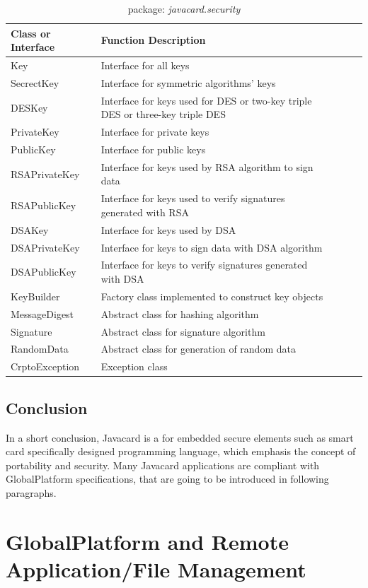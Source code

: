 \begin{table}[ht]
\caption{package: \emph{javacard.security}}
\centering
\begin{tabular}{lllll}
\hline
 Class or Interface & Function Description\\
\hline\hline
 Key &Interface for all keys   \\
 SecrectKey &Interface for symmetric algorithms' keys\\
DESKey & \parbox[t]{10cm}{Interface for keys used for DES or two-key triple DES or three-key triple DES}\\
PrivateKey &Interface for private keys\\
PublicKey & Interface for public keys\\
RSAPrivateKey& Interface for keys used by RSA algorithm to sign data\\
RSAPublicKey & Interface for keys used to verify signatures generated with RSA \\
DSAKey& Interface for keys used by DSA\\ 
DSAPrivateKey& Interface for keys to sign data with DSA algorithm\\
DSAPublicKey& Interface for keys to verify signatures generated with DSA\\
KeyBuilder& Factory class implemented to construct key objects\\
MessageDigest& Abstract class for hashing algorithm\\
Signature& Abstract class for signature algorithm\\
RandomData&Abstract class for generation of random data \\
CrptoException& Exception class\\
\hline
\end{tabular}
\label{table:javacard-security}
\end{table}

\subsection{Conclusion}
In a short conclusion, Javacard is a for embedded secure elements such as smart card specifically designed programming language, which emphasis the concept of portability and security. Many Javacard applications are compliant with GlobalPlatform specifications, that are going to be introduced in following paragraphs.

\section{GlobalPlatform and Remote Application/File Management}\label{secGP}

